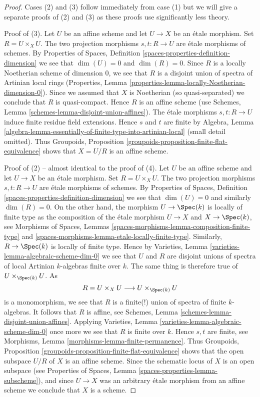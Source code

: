 \begin{proof}
Cases (2) and (3) follow immediately from case (1) but we will give a separate
proofs of (2) and (3) as these proofs use significantly less theory.

\medskip\noindent
Proof of (3). Let $U$ be an affine scheme and let $U \to X$ be an
\'etale morphism. Set $R = U \times_X U$. The two projection
morphisms $s, t : R \to U$ are \'etale morphisms of schemes. By
Properties of Spaces, Definition \ref{spaces-properties-definition-dimension}
we see that $\dim(U) = 0$ and $\dim(R) = 0$.
Since $R$ is a locally Noetherian scheme of dimension $0$,
we see that $R$ is a disjoint union of spectra of
Artinian local rings
(Properties, Lemma \ref{properties-lemma-locally-Noetherian-dimension-0}).
Since we assumed that $X$ is Noetherian (so quasi-separated) we
conclude that $R$ is quasi-compact. Hence $R$ is an affine scheme
(use Schemes, Lemma \ref{schemes-lemma-disjoint-union-affines}).
The \'etale morphisms $s, t : R \to U$ induce finite residue field
extensions. Hence $s$ and $t$ are finite by
Algebra, Lemma
\ref{algebra-lemma-essentially-of-finite-type-into-artinian-local}
(small detail omitted). 
Thus
Groupoids, Proposition \ref{groupoids-proposition-finite-flat-equivalence}
shows that $X = U/R$ is an affine scheme.

\medskip\noindent
Proof of (2) -- almost identical to the proof of (4).
Let $U$ be an affine scheme and let $U \to X$ be an \'etale morphism.
Set $R = U \times_X U$. The two projection morphisms
$s, t : R \to U$ are \'etale morphisms of schemes. By
Properties of Spaces, Definition \ref{spaces-properties-definition-dimension}
we see that $\dim(U) = 0$ and similarly $\dim(R) = 0$.
On the other hand, the morphism $U \to \Spec(k)$ is locally of finite
type as the composition of the \'etale morphism $U \to X$ and
$X \to \Spec(k)$, see
Morphisms of Spaces,
Lemmas \ref{spaces-morphisms-lemma-composition-finite-type} and
\ref{spaces-morphisms-lemma-etale-locally-finite-type}.
Similarly, $R \to \Spec(k)$ is locally of finite type.
Hence by
Varieties, Lemma \ref{varieties-lemma-algebraic-scheme-dim-0}
we see that $U$ and $R$ are disjoint unions of spectra of
local Artinian $k$-algebras finite over $k$. The same thing
is therefore true of $U \times_{\Spec(k)} U$. As
$$
R = U \times_X U \longrightarrow U \times_{\Spec(k)} U
$$
is a monomorphism, we see that $R$ is a finite(!) union of spectra of
finite $k$-algebras. It follows that $R$ is affine, see
Schemes, Lemma \ref{schemes-lemma-disjoint-union-affines}.
Applying
Varieties, Lemma \ref{varieties-lemma-algebraic-scheme-dim-0}
once more we see that $R$ is finite over $k$. Hence $s, t$
are finite, see
Morphisms, Lemma \ref{morphisms-lemma-finite-permanence}.
Thus
Groupoids, Proposition \ref{groupoids-proposition-finite-flat-equivalence}
shows that the open subspace $U/R$ of $X$ is an affine scheme. Since the
schematic locus of $X$ is an open subspace (see
Properties of Spaces, Lemma \ref{spaces-properties-lemma-subscheme}),
and since $U \to X$ was an arbitrary \'etale morphism from an affine scheme
we conclude that $X$ is a scheme.


\end{proof}
